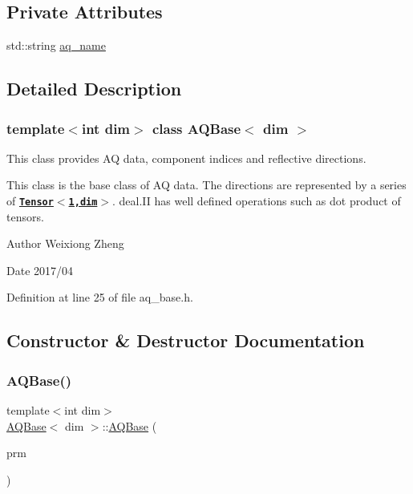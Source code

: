\subsection*{Private Attributes}
\begin{DoxyCompactItemize}
\item 
std\+::string \hyperlink{class_a_q_base_a3e50d2d59d1a4a2fabed3c4852f80c49}{aq\+\_\+name}
\end{DoxyCompactItemize}


\subsection{Detailed Description}
\subsubsection*{template$<$int dim$>$\newline
class A\+Q\+Base$<$ dim $>$}

This class provides AQ data, component indices and reflective directions. 

This class is the base class of AQ data. The directions are represented by a series of \href{https://www.dealii.org/8.5.0/doxygen/deal.II/classTensor.htm
l}{\tt {\bfseries Tensor$<$1,dim$>$}}. deal.\+II has well defined operations such as dot product of tensors.

\begin{DoxyAuthor}{Author}
Weixiong Zheng 
\end{DoxyAuthor}
\begin{DoxyDate}{Date}
2017/04 
\end{DoxyDate}


Definition at line 25 of file aq\+\_\+base.\+h.



\subsection{Constructor \& Destructor Documentation}
\mbox{\label{class_a_q_base_a3a05ceb6b201b4e6e605b260d766842d}} 
\subsubsection{\texorpdfstring{A\+Q\+Base()}{AQBase()}}
{\footnotesize\ttfamily template$<$int dim$>$ \\
\hyperlink{class_a_q_base}{A\+Q\+Base}$<$ dim $>$\+::\hyperlink{class_a_q_base}{A\+Q\+Base} (\begin{DoxyParamCaption}\item[{Parameter\+Handler \&}]{prm }\end{DoxyParamCaption})}

